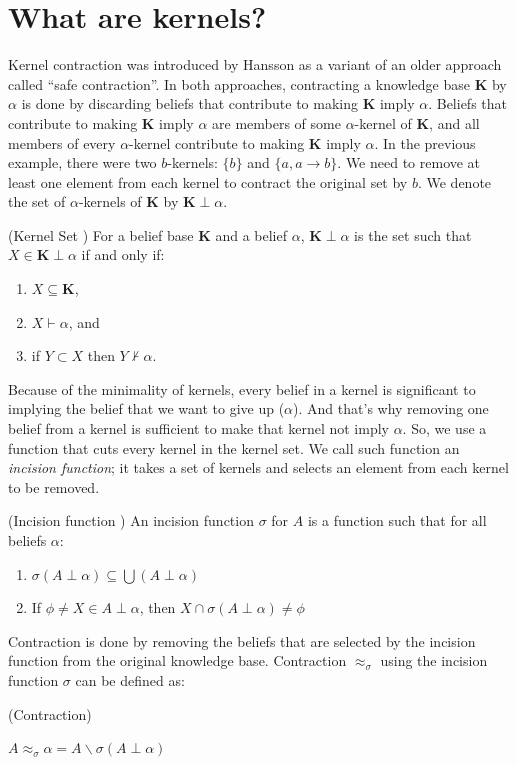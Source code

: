 \section{What are kernels?}
\label{kernels-def}
Kernel contraction was introduced by Hansson \cite{kernel} as a variant of an older approach called ``safe contraction''\cite{safe}. In both approaches, contracting a knowledge base \textbf{K} by $\alpha$ is done by discarding beliefs that contribute to making \textbf{K} imply $\alpha$. Beliefs that contribute to making \textbf{K} imply $\alpha$ are members of some $\alpha$-kernel of \textbf{K}, and all members of every $\alpha$-kernel contribute to making \textbf{K} imply $\alpha$. In the previous example, there were two $b$-kernels: $\lbrace b \rbrace$ and $\lbrace a, a \rightarrow b \rbrace$. We need to remove at least one element from each kernel to contract the original set by $b$. We denote the set of $\alpha$-kernels of \textbf{K} by $\textbf{K} \perp \alpha$.
\begin{defn}(Kernel Set \cite{hansson})
For a belief base \textbf{K} and a belief $\alpha$, $\textbf{K} \perp \alpha$ is the set such that $X \in \textbf{K} \perp \alpha$ if and only if:
\begin{enumerate}
\item $X \subseteq \textbf{K}$,
\item $X \vdash \alpha$, and
\item if $Y \subset X$ then $Y \nvdash \alpha$.
\end{enumerate}
\end{defn}

Because of the minimality of kernels, every belief in a kernel is significant to implying the belief that we want to give up ($\alpha$). And that's why removing one belief from a kernel is sufficient to make that kernel not imply $\alpha$. So, we use a function that cuts every kernel in the kernel set. We call such function an \textit{incision function}; it takes a set of kernels and selects an element from each kernel to be removed.

\begin{defn}(Incision function \cite{kernel})
An incision function $\sigma$ for $A$ is a function such that for all beliefs $\alpha$:
\begin{enumerate}
\item $\sigma (A \perp \alpha) \subseteq \bigcup (A \perp \alpha)$
\item If $\phi \neq X \in A \perp \alpha$, then $X \cap \sigma (A \perp \alpha) \neq \phi$
\end{enumerate}
\end{defn}
Contraction is done by removing the beliefs that are selected by the incision function from the original knowledge base. Contraction $\approx_\sigma$ using the incision function $\sigma$ can be defined as:
\begin{defn}\cite{hansson} (Contraction)
\begin{center}
$A \approx_\sigma \alpha = A \smallsetminus \sigma (A \perp \alpha)$
\end{center}
\end{defn}



